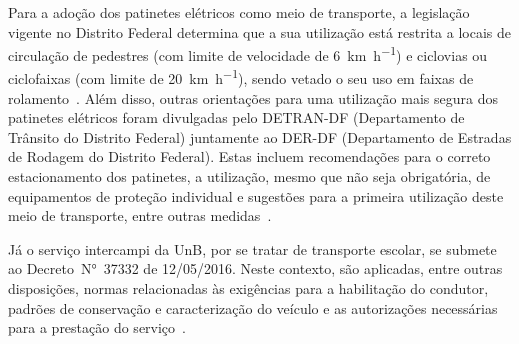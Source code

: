 Para a adoção dos patinetes elétricos como meio de transporte, a legislação vigente no Distrito Federal determina que a sua utilização está restrita a locais de circulação de pedestres (com limite de velocidade de \SI{6}{\km\per\hour}) e ciclovias ou ciclofaixas (com limite de \SI{20}{\km\per\hour}), sendo vetado o seu uso em faixas de rolamento~\cite{detran2019}. Além disso, outras orientações para uma utilização mais segura dos patinetes elétricos foram divulgadas pelo DETRAN\nobreakdash-DF (Departamento de Trânsito do Distrito Federal) juntamente ao DER\nobreakdash-DF (Departamento de Estradas de Rodagem do Distrito Federal). Estas incluem recomendações para o correto estacionamento dos patinetes, a utilização, mesmo que não seja obrigatória, de equipamentos de proteção individual e sugestões para a primeira utilização deste meio de transporte, entre outras medidas~\cite{detran2019}.

Já o serviço intercampi da UnB, por se tratar de transporte escolar, se submete ao Decreto~N°~\num{37332} de 12/05/2016. Neste contexto, são aplicadas, entre outras disposições, normas relacionadas às exigências para a habilitação do condutor, padrões de conservação e caracterização do veículo e as autorizações necessárias para a prestação do serviço~\cite{decreto:37332:2016}.

